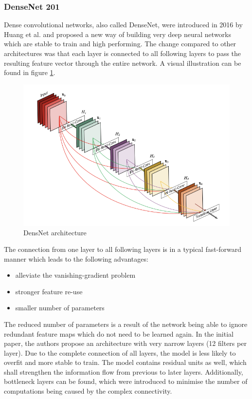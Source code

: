 \subsubsection{DenseNet 201}

Dense convolutional networks, also called DenseNet, were introduced in 2016 by Huang et al. and proposed a new way of building very deep neural networks which are stable to train and high performing. The change compared to other architectures was that each layer is connected to all following layers to pass the resulting feature vector through the entire network\cite{huang2018densely}. A visual illustration can be found in figure \ref{densnet}.

\begin{figure}[ht]
  \centering
  \includegraphics[width=\linewidth]{figures/densenet.png}
  \caption{DensNet architecture\cite{huang2018densely}}
  \label{densnet}
\end{figure}

The connection from one layer to all following layers is in a typical fast-forward manner which leads to the following advantages:
\begin{itemize}
  \item alleviate the vanishing-gradient problem
  \item stronger feature re-use
  \item smaller number of parameters
\end{itemize}

The reduced number of parameters is a result of the network being able to ignore redundant feature maps which do not need to be learned again. In the initial paper, the authors propose an architecture with very narrow layers (12 filters per layer)\cite{huang2018densely}. Due to the complete connection of all layers, the model is less likely to overfit and more stable to train.
The model contains residual units as well, which shall strengthen the information flow from previous to later layers. Additionally, bottleneck layers can be found, which were introduced to minimise the number of computations being caused by the complex connectivity.

